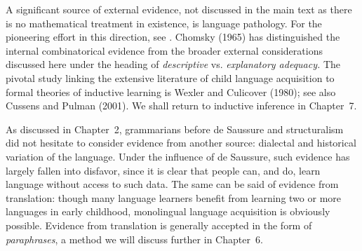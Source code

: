A significant source of external evidence, not discussed in the main text as
there is no mathematical treatment in existence, is language pathology. For
the pioneering effort in this direction, see .  Chomsky
(1965) has distinguished the internal combinatorical evidence from the
broader external considerations discussed here under the heading of {\it
  descriptive} vs. {\it explanatory adequacy.} 
 The pivotal study linking the extensive
literature of child language acquisition to formal theories of inductive
learning is Wexler and Culicover (1980);\nocite{Wexler:1980} see also Cussens
and Pulman (2001).\nocite{Cussens:2001} We shall return to inductive
inference in Chapter~7.

As discussed in Chapter~2, grammarians before de Saussure and structuralism
did not hesitate to consider evidence from another source: dialectal and
historical variation of the language.  Under the influence of de Saussure,
such evidence has largely fallen into disfavor, since it is clear that people
can, and do, learn language without access to such data. The same can be
said of evidence from translation: though many language learners benefit from
learning two or more languages in early childhood, monolingual language
acquisition is obviously possible. Evidence from translation is generally
accepted in the form of {\it paraphrases}, a method we will discuss 
further in Chapter~6. 

\endinput


substitution tests show that what we counted as complement 4 is not at all a
true complement to the verb but rather a free sentence adverbial {\it
adjunct:} such elements are called free because they can be attached to 
virtually every sentence as in {\it For a barbershop John was willing to 
suffer any indignity}

whether the semantic relation of this argument to the event described by the
verb is active (agent), passive (experiencer), or something 
undergoer/experiencer, or something more nebulous such as the theme. 





